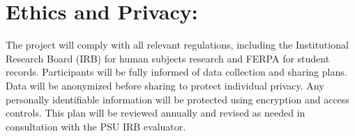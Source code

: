 \documentclass[11pt]{article}
\begin{document}
\vspace{0.3cm}
\section{Ethics and Privacy:} 
The project will comply with all relevant regulations, including the Institutional Research Board (IRB) for human subjects research and FERPA for student records. Participants will be fully informed of data collection and sharing plans. 
Data will be anonymized before sharing to protect individual privacy.
Any personally identifiable information will be protected using encryption and access controls.
This plan will be reviewed annually and revised as needed in consultation with the PSU IRB evaluator. 
\end{document}
